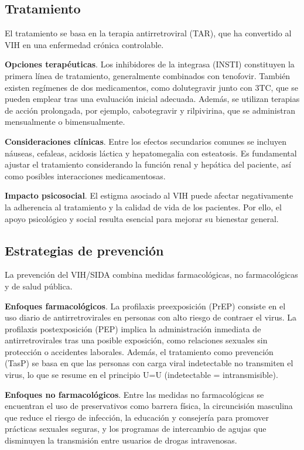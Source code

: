 \subsection{Tratamiento}
El tratamiento se basa en la terapia antirretroviral (TAR), que ha convertido al VIH en una enfermedad crónica controlable.

\textbf{Opciones terapéuticas}. Los inhibidores de la integrasa (INSTI) constituyen la primera línea de tratamiento, generalmente combinados con tenofovir. También existen regímenes de dos medicamentos, como dolutegravir junto con 3TC, que se pueden emplear tras una evaluación inicial adecuada. Además, se utilizan terapias de acción prolongada, por ejemplo, cabotegravir y rilpivirina, que se administran mensualmente o bimensualmente.

\textbf{Consideraciones clínicas}. Entre los efectos secundarios comunes se incluyen náuseas, cefaleas, acidosis láctica y hepatomegalia con esteatosis. Es fundamental ajustar el tratamiento considerando la función renal y hepática del paciente, así como posibles interacciones medicamentosas.

\textbf{Impacto psicosocial}. El estigma asociado al VIH puede afectar negativamente la adherencia al tratamiento y la calidad de vida de los pacientes. Por ello, el apoyo psicológico y social resulta esencial para mejorar su bienestar general.

\subsection{Estrategias de prevención}
La prevención del VIH/SIDA combina medidas farmacológicas, no farmacológicas y de salud pública.

\textbf{Enfoques farmacológicos}.
La profilaxis preexposición (PrEP) consiste en el uso diario de antirretrovirales en personas con alto riesgo de contraer el virus. La profilaxis postexposición (PEP) implica la administración inmediata de antirretrovirales tras una posible exposición, como relaciones sexuales sin protección o accidentes laborales. Además, el tratamiento como prevención (TasP) se basa en que las personas con carga viral indetectable no transmiten el virus, lo que se resume en el principio U=U (indetectable = intransmisible).

\textbf{Enfoques no farmacológicos}.
Entre las medidas no farmacológicas se encuentran el uso de preservativos como barrera física, la circuncisión masculina que reduce el riesgo de infección, la educación y consejería para promover prácticas sexuales seguras, y los programas de intercambio de agujas que disminuyen la transmisión entre usuarios de drogas intravenosas.

